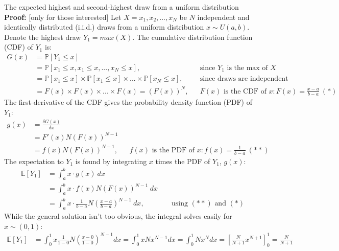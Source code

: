 \begin{frame}{The expected highest and second-highest draw from a uniform distribution}
    \textbf{Proof:} [only for those interested] Let $X=x_1,x_2,...,x_N$ be $N$ independent and identically distributed (i.i.d.) draws from a uniform distribution $x\sim U(a, b)$. Denote the highest draw $Y_1=max(X)$. The cumulative distribution function (CDF) of $Y_1$ is: \vspace{-6pt}
    \begin{align*}
      G(x)&=\mathbb{P}[Y_1\leq x]\\
          &=\mathbb{P}[x_1\leq x,x_1\leq x,...,x_N\leq x],&&\text{since $Y_1$ is the max of }X\\
          &=\mathbb{P}[x_1\leq x]\times\mathbb{P}[x_1\leq x]\times...\times\mathbb{P}[x_N\leq x],&&\text{since draws are independent}\\
          &=F(x)\times F(x)\times...\times F(x)=(F(x))^N,&&F(x)\text{ is the CDF of }x:F(x)=\frac{x-a}{b-a}\ (*)
    \end{align*}
    The first-derivative of the CDF gives the probability density function (PDF) of $Y_1$: \vspace{-6pt}
    \begin{align*}
      g(x)&=\frac{\delta G(x)}{\delta x}\\
          &= F'(x)N(F(x))^{N-1}\\
          &= f(x)N(F(x))^{N-1},&&f(x)\text{ is the PDF of }x:f(x)=\frac{1}{b-a}\ (**)
    \end{align*}
    The expectation to $Y_1$ is found by integrating $x$ times the PDF of $Y_1$, $g(x)$: \vspace{-6pt}
    \begin{align*}
      \mathbb{E}[Y_1]&=\textstyle\int_a^b x\cdot g(x)\ dx\\
                     &=\textstyle\int_a^b x\cdot f(x)N(F(x))^{N-1}\ dx\\
                     &=\textstyle\int_a^b x\cdot \frac{1}{b-a}N\left(\frac{x-a}{b-a}\right)^{N-1}\ dx,&&\text{ using }(**)\text{ and }(*)
    \end{align*}
    While the general solution isn't too obvious, the integral solves easily for $x\sim (0, 1)$: \vspace{-5pt}
    \begin{align*}
      \mathbb{E}[Y_1]&=\textstyle\int_0^1 x  \frac{1}{1-0}N\left(\frac{x-0}{1-0}\right)^{N-1} dx
      =\textstyle\int_0^1 x N x^{N-1} dx
      =\textstyle\int_0^1 N x^N dx
      =\left[\frac{N}{N+1} x^{N+1}\right]_0^1 = \frac{N}{N+1}
    \end{align*}
    \vfill\null
\end{frame}
